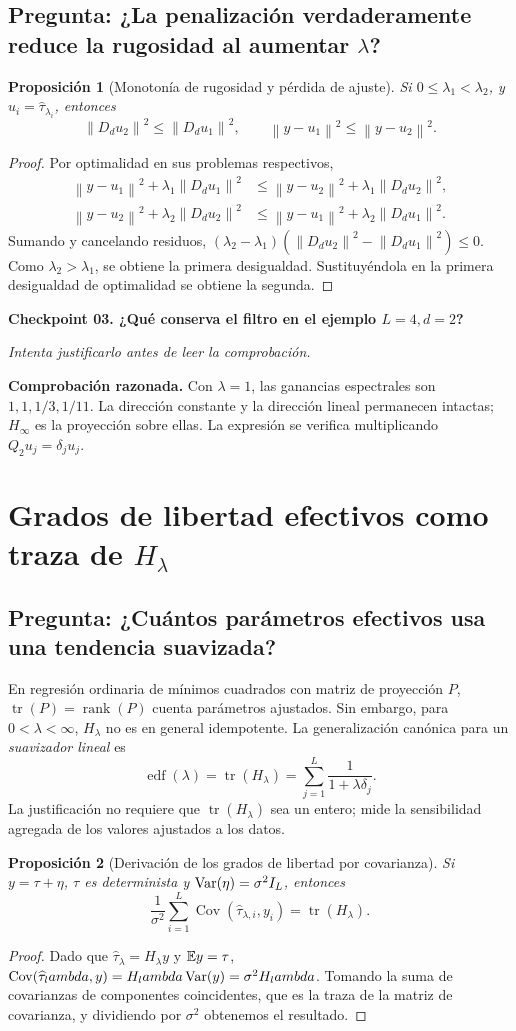 \documentclass[11pt,letterpaper,parskip=half,headings=small]{scrartcl}
\newtheorem{proposicion}{Proposición}[section]
\theoremstyle{definition}\newtheorem{definicion}[proposicion]{Definición}
\theoremstyle{remark}\newtheorem{observacion}[proposicion]{Observación}
\newcommand{\Cov}{\operatorname{Cov}}\newcommand{\tr}{\operatorname{tr}}
\newcommand{\rank}{\operatorname{rank}}\newcommand{\nul}{\operatorname{ker}}
\newcommand{\norm}[1]{\left\lVert#1\right\rVert}\newcommand{\inner}[2]{\left\langle#1,#2\right\rangle}
\newcommand{\pregunta}[1]{\subsection{Pregunta: #1}}
\newcommand{\checkpoint}[3]{%
  \par\medskip\noindent\textbf{\color{blue!45!black}Checkpoint #1. #2}\par
  \noindent\emph{Intenta justificarlo antes de leer la comprobación.}\par
  \noindent\textbf{Comprobación razonada. }#3\par\bigskip
}
\begin{document}
\pregunta{¿La penalización verdaderamente reduce la rugosidad al aumentar $\lambda$?}
\begin{proposicion}[Monotonía de rugosidad y pérdida de ajuste]
Si $0\leq\lambda_1<\lambda_2$, y $u_i=\widehat\tau_{\lambda_i}$, entonces
\[
\norm{D_du_2}^2\leq\norm{D_du_1}^2,\qquad
\norm{y-u_1}^2\leq\norm{y-u_2}^2.
\]
\end{proposicion}
\begin{proof}
Por optimalidad en sus problemas respectivos,
\begin{align*}
\norm{y-u_1}^2+\lambda_1\norm{D_du_1}^2
&\leq\norm{y-u_2}^2+\lambda_1\norm{D_du_2}^2,\\
\norm{y-u_2}^2+\lambda_2\norm{D_du_2}^2
&\leq\norm{y-u_1}^2+\lambda_2\norm{D_du_1}^2.
\end{align*}
Sumando y cancelando residuos,
$(\lambda_2-\lambda_1)(\norm{D_du_2}^2-\norm{D_du_1}^2)\leq0$.
Como $\lambda_2>\lambda_1$, se obtiene la primera desigualdad. Sustituyéndola en la primera desigualdad de optimalidad se obtiene la segunda.
\end{proof}

\checkpoint{03}{¿Qué conserva el filtro en el ejemplo $L=4,d=2$?}{Con $\lambda=1$, las ganancias espectrales son $1,1,1/3,1/11$. La dirección constante y la dirección lineal permanecen intactas; $H_\infty$ es la proyección sobre ellas. La expresión se verifica multiplicando $Q_2u_j=\delta_ju_j$.}

\section{Grados de libertad efectivos como traza de $H_\lambda$}
\pregunta{¿Cuántos parámetros efectivos usa una tendencia suavizada?}
En regresión ordinaria de mínimos cuadrados con matriz de proyección $P$, $\tr(P)=\rank(P)$ cuenta parámetros ajustados. Sin embargo, para $0<\lambda<\infty$, $H_\lambda$ no es en general idempotente. La generalización canónica para un \emph{suavizador lineal} es
\begin{equation}\label{eq:edf}\boxed{\operatorname{edf}(\lambda)=\tr(H_\lambda)=
\sum_{j=1}^L\frac{1}{1+\lambda\delta_j}.}\end{equation}
La justificación no requiere que $\tr(H_\lambda)$ sea un entero; mide la sensibilidad agregada de los valores ajustados a los datos.

\begin{proposicion}[Derivación de los grados de libertad por covarianza]
Si $y=\tau+\eta$, $\tau$ es determinista y $\operatorname{Var}(\eta)=\sigma^2I_L$, entonces
\[
\frac{1}{\sigma^2}\sum_{i=1}^L\Cov(\widehat\tau_{\lambda,i},y_i)
=\tr(H_\lambda).
\]
\end{proposicion}
\begin{proof}
Dado que $\widehat\tau_\lambda=H_\lambda y$ y $\mathbb E y=\tau$,
$\Cov(\widehat\tau_\lambda,y)=H_\lambda\Var(y)=\sigma^2H_\lambda$.
Tomando la suma de covarianzas de componentes coincidentes, que es la traza de la matriz de covarianza, y dividiendo por $\sigma^2$ obtenemos el resultado.
\end{proof}
\end{document}
